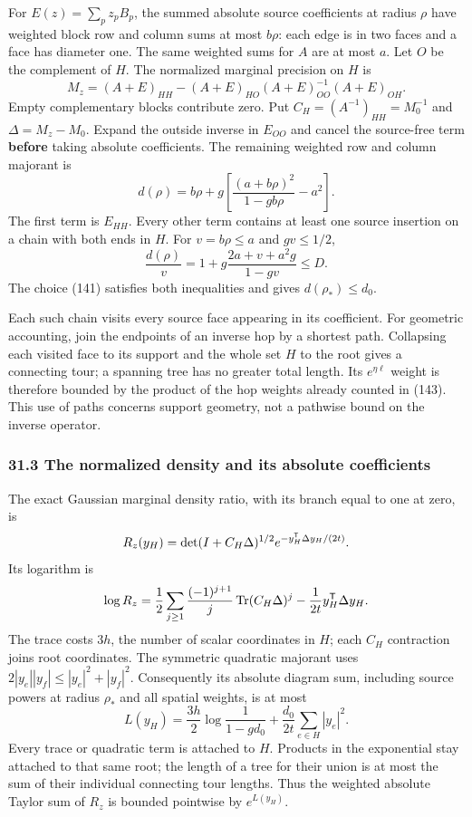 \documentclass[11pt,a4paper]{article}
\begin{document}
For \(E(z)=\sum_pz_pB_p\), the summed absolute source coefficients at
radius \(\rho\) have weighted block row and column sums at most
\(b\rho\): each edge is in two faces and a face has diameter one. The
same weighted sums for \(A\) are at most \(a\). Let \(O\) be the
complement of \(H\). The normalized marginal precision on \(H\) is
\[M_z=(A+E)_{HH}-(A+E)_{HO}
                      (A+E)_{OO}^{-1}(A+E)_{OH}.\] Empty complementary
blocks contribute zero. Put \(C_H=(A^{-1})_{HH}=M_0^{-1}\) and
\(\Delta=M_z-M_0\). Expand the outside inverse in \(E_{OO}\) and cancel
the source-free term \textbf{before} taking absolute coefficients. The
remaining weighted row and column majorant is \[d(\rho)=b\rho+
g\left[\frac{(a+b\rho)^2}{1-gb\rho}-a^2\right].\tag{143}\] The first
term is \(E_{HH}\). Every other term contains at least one source
insertion on a chain with both ends in \(H\). For \(v=b\rho\le a\) and
\(gv\le1/2\), \[\frac{d(\rho)}v
=1+g\frac{2a+v+a^2g}{1-gv}\le D.\] The choice (141) satisfies both
inequalities and gives \(d(\rho_*)\le d_0\).

Each such chain visits every source face appearing in its coefficient.
For geometric accounting, join the endpoints of an inverse hop by a
shortest path. Collapsing each visited face to its support and the whole
set \(H\) to the root gives a connecting tour; a spanning tree has no
greater total length. Its \(e^{\eta\ell}\) weight is therefore bounded
by the product of the hop weights already counted in (143). This use of
paths concerns support geometry, not a pathwise bound on the inverse
operator.

\hypertarget{the-normalized-density-and-its-absolute-coefficients}{%
\subsubsection{31.3 The normalized density and its absolute
coefficients}\label{the-normalized-density-and-its-absolute-coefficients}}

The exact Gaussian marginal density ratio, with its branch equal to one
at zero, is \[R_z(y_H)=\det(I+C_H\Delta)^{1/2}
                 e^{-y_H^{\sf T}\Delta y_H/(2t)}.\] Its logarithm is
\[\log R_z=
\frac12\sum_{j\ge1}\frac{(-1)^{j+1}}j
                    \operatorname{Tr}(C_H\Delta)^j
-\frac1{2t}y_H^{\sf T}\Delta y_H.\] The trace costs \(3h\), the number
of scalar coordinates in \(H\); each \(C_H\) contraction joins root
coordinates. The symmetric quadratic majorant uses
\(2|y_e||y_f|\le|y_e|^2+|y_f|^2\). Consequently its absolute diagram
sum, including source powers at radius \(\rho_*\) and all spatial
weights, is at most \[L(y_H)=\frac{3h}2\log\frac1{1-gd_0}
              +\frac{d_0}{2t}\sum_{e\in H}|y_e|^2.\tag{144}\] Every
trace or quadratic term is attached to \(H\). Products in the
exponential stay attached to that same root; the length of a tree for
their union is at most the sum of their individual connecting tour
lengths. Thus the weighted absolute Taylor sum of \(R_z\) is bounded
pointwise by \(e^{L(y_H)}\).
\end{document}
